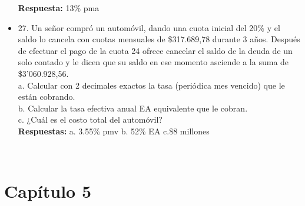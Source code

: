 \begin{itemize}
	\textbf{Respuesta:} 13\% pma\\
	\medskip
	\item 27. Un señor compró un automóvil, dando una cuota inicial del 20\% y el saldo lo cancela con cuotas mensuales de \$317.689,78 durante 3 años. Después de efectuar el pago de la cuota 24 ofrece cancelar el saldo de la deuda de un solo contado y le dicen que su saldo en ese momento asciende a la suma de \$3'060.928,56.\\
	
	a. Calcular con 2 decimales exactos la tasa (periódica mes vencido) que le están cobrando.\\
	b. Calcular la tasa efectiva anual EA equivalente que le cobran.\\
	c. ¿Cuál es el costo total del automóvil?\\
	\textbf{Respuestas:} a. 3.55\% pmv  \hspace{0,5cm} b. 52\% EA  \hspace{0,5cm} c.\$8 millones
	
\end{itemize}\
\newpage


\chapter*{Capítulo 5}



